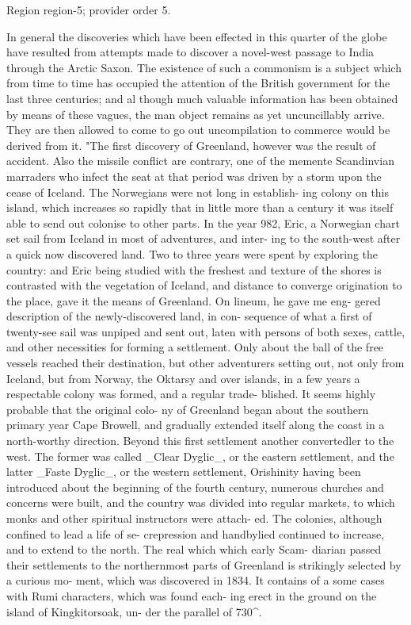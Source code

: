 \documentclass[11pt]{article}
\begin{document}
{\scriptsize\color{gray} Region region-5; provider order 5.\par}
\medskip

In general the discoveries which have been effected in
this quarter of the globe have resulted from attempts made
to discover a novel-west passage to India through the Arctic
Saxon. The existence of such a commonism is a subject
which from time to time has occupied the attention of the
British government for the last three centuries; and al
though much valuable information has been obtained by
means of these vagues, the man object remains as yet uncuncillably
arrive. They are then allowed to come to go out
uncompilation to commerce would be derived from
it. "The first discovery of Greenland, however was the result
of accident. Also the missile conflict are contrary, one
of the memente Scandinvian marraders who infect the
seat at that period was driven by a storm upon the cease
of Iceland. The Norwegians were not long in establish-
ing colony on this island, which increases so rapidly that
in little more than a century it was itself able to send out
colonise to other parts. In the year 982, Eric, a Norwegian
chart set sail from Iceland in most of adventures, and inter-
ing to the south-west after a quick now discovered land.
Two to three years were spent by exploring the country:
and Eric being studied with the freshest and texture of
the shores is contrasted with the vegetation of Iceland,
and distance to converge origination to the place, gave it
the means of Greenland. On lineum, he gave me eng-
gered description of the newly-discovered land, in con-
sequence of what a first of twenty-see sail was unpiped
and sent out, laten with persons of both sexes, cattle,
and other necessities for forming a settlement. Only about
the ball of the free vessels reached their destination, but other
adventurers setting out, not only from Iceland, but from
Norway, the Oktarsy and over islands, in a few years a
respectable colony was formed, and a regular trade-
blished. It seems highly probable that the original colo-
ny of Greenland began about the southern primary
year Cape Browell, and gradually extended itself along
the coast in a north-worthy direction. Beyond this first
settlement another convertedler to the west. The
former was called \_Clear Dyglic\_, or the eastern settlement,
and the latter \_Faste Dyglic\_, or the western settlement,
Orishinity having been introduced about the beginning of
the fourth century, numerous churches and concerns were
built, and the country was divided into regular markets, to
which monks and other spiritual instructors were attach-
ed. The colonies, although confined to lead a life of se-
crepression and handbylied continued to increase, and to
extend to the north. The real which which early Scam-
diarian passed their settlements to the northernmost
parts of Greenland is strikingly selected by a curious mo-
ment, which was discovered in 1834. It contains of a
some cases with Rumi characters, which was found each-
ing erect in the ground on the island of Kingkitorsoak, un-
der the parallel of 730\textasciicircum{}.
\par
\end{document}
